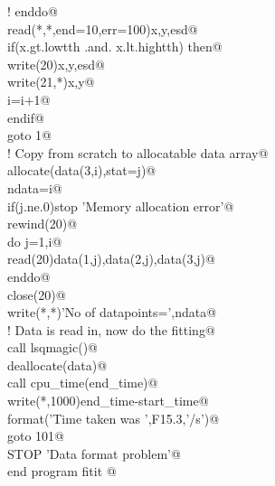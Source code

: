 \documentclass[10pt,a4paper,notitlepage]{article}
\begin{document}
\begin{flushleft}
\begin{minipage}{\linewidth}
\begin{list}{}{}
\mbox{}\verb@!      enddo@\\
\mbox{}     read(*,*,end=10,err=100)x,y,esd@\\
\mbox{}\verb@      if(x.gt.lowtth .and. x.lt.hightth) then@\\
\mbox{}\verb@        write(20)x,y,esd@\\
\mbox{}\verb@        write(21,*)x,y@\\
\mbox{}\verb@        i=i+1@\\
\mbox{}\verb@      endif@\\
\mbox{}\verb@      goto 1@\\
\mbox{}\verb@! Copy from scratch to allocatable data array@\\
\mbox{}    allocate(data(3,i),stat=j)@\\
\mbox{}\verb@      ndata=i@\\
\mbox{}\verb@      if(j.ne.0)stop 'Memory allocation error'@\\
\mbox{}\verb@      rewind(20)@\\
\mbox{}\verb@      do j=1,i@\\
\mbox{}\verb@        read(20)data(1,j),data(2,j),data(3,j)@\\
\mbox{}\verb@      enddo@\\
\mbox{}\verb@      close(20)@\\
\mbox{}\verb@      write(*,*)'No of datapoints=',ndata@\\
\mbox{}\verb@! Data is read in, now do the fitting@\\
\mbox{}\verb@      call lsqmagic()@\\
\mbox{}\verb@      deallocate(data)@\\
\mbox{}\verb@      call cpu_time(end_time)@\\
\mbox{}\verb@      write(*,1000)end_time-start_time@\\
\mbox{}  format('Time taken was ',F15.3,'/s')@\\
\mbox{}\verb@      goto 101@\\
\mbox{}   STOP 'Data format problem'@\\
\mbox{}   end program fitit                                                      @{\NWsep}
\end{list}
\vspace{-1.5ex}
\footnotesize
\begin{list}{}{\setlength{\itemsep}{-\parsep}\setlength{\itemindent}{-\leftmargin}}

\item{}
\end{list}
\end{minipage}\vspace{4ex}
\end{flushleft}
\end{document}
